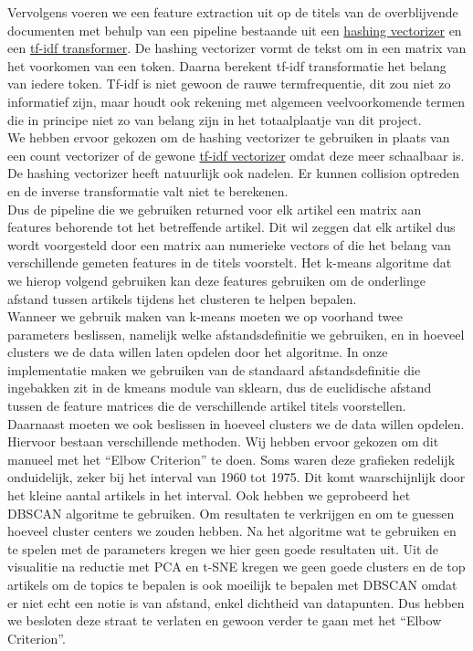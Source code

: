 \documentclass[a4paper,fontsize=11pt]{article}
\begin{document}
Vervolgens voeren we een feature extraction uit op de titels van de overblijvende documenten met behulp van een pipeline bestaande uit een \hyperlink{https://scikit-learn.org/stable/modules/generated/sklearn.feature_extraction.text.HashingVectorizer.html}{hashing vectorizer} en een \hyperlink{https://scikit-learn.org/stable/modules/generated/sklearn.feature_extraction.text.TfidfTransformer.html}{tf-idf transformer}. De hashing vectorizer vormt de tekst om in een matrix van het voorkomen van een token. Daarna berekent tf-idf transformatie het belang van iedere token. Tf-idf is niet gewoon de rauwe termfrequentie, dit zou niet zo informatief zijn, maar houdt ook rekening met algemeen veelvoorkomende termen die in principe niet zo van belang zijn in het totaalplaatje van dit project. \\

We hebben ervoor gekozen om de hashing vectorizer te gebruiken in plaats van een count vectorizer of de gewone \hyperlink{https://scikit-learn.org/stable/modules/generated/sklearn.feature_extraction.text.TfidfVectorizer.html}{tf-idf vectorizer} omdat deze meer schaalbaar is. De hashing vectorizer heeft natuurlijk ook nadelen. Er kunnen collision optreden en de inverse transformatie valt niet te berekenen. \\

Dus de pipeline die we gebruiken returned voor elk artikel een matrix aan features behorende tot het betreffende artikel. Dit wil zeggen dat elk artikel dus wordt voorgesteld door een matrix aan numerieke vectors of die het belang van verschillende gemeten features in de titels voorstelt. Het k-means algoritme dat we hierop volgend gebruiken kan deze features gebruiken om de onderlinge afstand tussen artikels tijdens het clusteren te helpen bepalen. \\

Wanneer we gebruik maken van k-means moeten we op voorhand twee parameters beslissen, namelijk welke afstandsdefinitie we gebruiken, en in hoeveel clusters we de data willen laten opdelen door het algoritme. In onze implementatie maken we gebruiken van de standaard afstandsdefinitie die ingebakken zit in de kmeans module van sklearn, dus de euclidische afstand tussen de feature matrices die de verschillende artikel titels voorstellen. Daarnaast moeten we ook beslissen in hoeveel clusters we de data willen opdelen. Hiervoor bestaan verschillende methoden.
Wij hebben ervoor gekozen om dit manueel met het ``Elbow Criterion'' te doen. Soms waren deze grafieken redelijk onduidelijk, zeker bij het interval van 1960 tot 1975. Dit komt waarschijnlijk door het kleine aantal artikels in het interval. Ook hebben we geprobeerd het DBSCAN algoritme te gebruiken. Om resultaten te verkrijgen en om te guessen hoeveel cluster centers we zouden hebben. Na het algoritme wat te gebruiken en te spelen met de parameters kregen we hier geen goede resultaten uit. Uit de visualitie na reductie met PCA en t-SNE kregen we geen goede clusters en de top artikels om de topics te bepalen is ook moeilijk te bepalen met DBSCAN omdat er niet echt een notie is van afstand, enkel dichtheid van datapunten. Dus hebben we besloten deze straat te verlaten en gewoon verder te gaan met het ``Elbow Criterion''.
\end{document}

